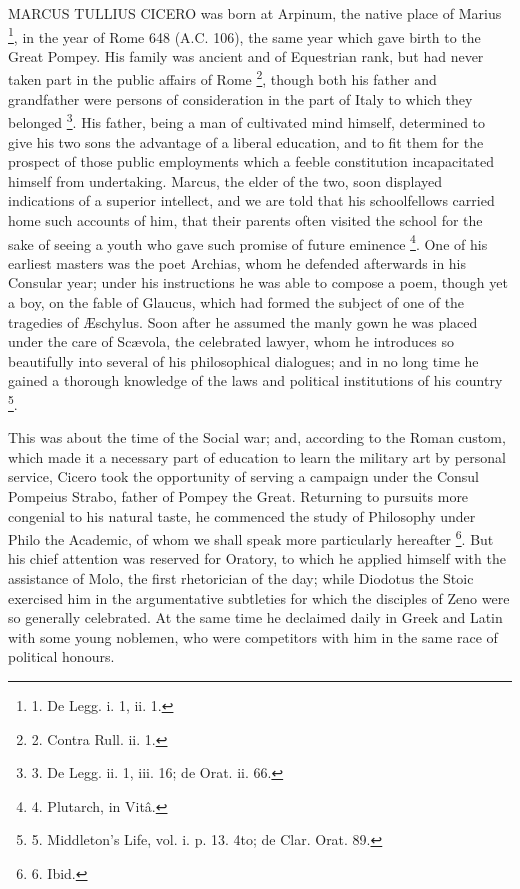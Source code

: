 MARCUS
TULLIUS CICERO
was born at Arpinum, the native place of Marius \footnote{1. De Legg. i. 1, ii. 1.}, in the year of Rome 648 (A.C. 106), the
same year which gave birth to the Great Pompey. His family was ancient
and of Equestrian rank, but had never taken part in the public affairs
of Rome \footnote{2.
Contra Rull. ii. 1.}, though both his
father and grandfather were persons of consideration in the part of
Italy to which they belonged \footnote{3.
De Legg. ii. 1, iii. 16; de Orat. ii. 66.}.
His father, being a man of cultivated mind himself, determined to give
his two sons the advantage of a liberal education, and to fit them for
the prospect of those public employments which a feeble constitution
incapacitated himself from undertaking. Marcus, the elder of the two,
soon displayed indications of a superior intellect, and we are told
that his schoolfellows carried home such accounts of him, that their
parents often visited the school for the sake of seeing a youth who
gave such promise of future eminence \footnote{4.
Plutarch, in Vitâ.}. One of his earliest masters was the poet Archias, whom he
defended afterwards in his Consular year; under his instructions he
was able to compose a poem, though yet a boy, on the fable of Glaucus,
which had formed the subject of one of the tragedies of Æschylus.
Soon after he assumed the manly gown he was placed under the
care of Scævola, the celebrated lawyer, whom he introduces so
beautifully into several of his philosophical dialogues; and in no
long time he gained a thorough knowledge of the laws and political
institutions of his country \footnote{5.
Middleton's Life, vol. i. p. 13. 4to; de Clar. Orat. 89.}.

This was about the time of the
Social war; and, according to the Roman custom, which made it a
necessary part of education to learn the military art by personal
service, Cicero took the opportunity of serving a campaign under the
Consul Pompeius Strabo, father of Pompey the Great. Returning to
pursuits more congenial to his natural taste, he commenced the study
of Philosophy under Philo the Academic, of whom we shall speak more
particularly hereafter \footnote{6.
Ibid.}.
But his chief attention was reserved for Oratory, to which he applied
himself with the assistance of Molo, the first rhetorician of the day;
while Diodotus the Stoic exercised him in the argumentative subtleties
for which the disciples of Zeno were so generally celebrated. At the
same time he declaimed daily in Greek and Latin with some young
noblemen, who were competitors with him in the same race of political
honours.

